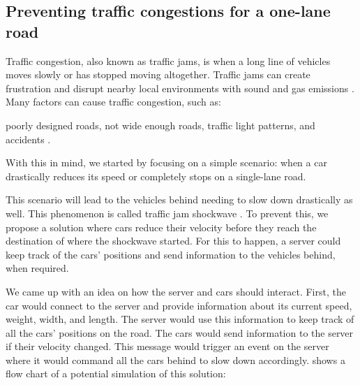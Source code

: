\subsection{Preventing traffic congestions for a one-lane road}

Traffic congestion, also known as traffic jams, is when a long line of vehicles moves slowly or has stopped moving altogether. Traffic jams can create frustration and disrupt nearby local environments with sound and gas emissions \parencite{traffic_congestion_pollution}. Many factors can cause traffic congestion, such as:

poorly designed roads, not wide enough roads, traffic light patterns, and accidents \parencite{traffic_congestion}.

With this in mind, we started by focusing on a simple scenario: when a car drastically reduces its speed or completely stops on a single-lane road.

This scenario will lead to the vehicles behind needing to slow down drastically as well. This phenomenon is called traffic jam shockwave \parencite{traffic_shockwave}. To prevent this, we propose a solution where cars reduce their velocity before they reach the destination of where the shockwave started. For this to happen, a server could keep track of the cars' positions and send information to the vehicles behind, when required. 

We came up with an idea on how the server and cars should interact. First, the car would connect to the server and provide information about its current speed, weight, width, and length. The server would use this information to keep track of all the cars' positions on the road. The cars would send information to the server if their velocity changed. This message would trigger an event on the server where it would command all the cars behind to slow down accordingly.  shows a flow chart of a potential simulation of this solution:


